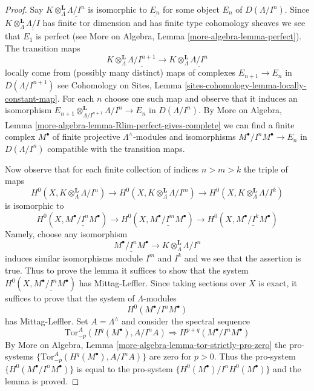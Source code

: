 \begin{proof}
Say $K \otimes_\Lambda^\mathbf{L} \underline{\Lambda/I^n}$ is isomorphic
to $\underline{E_n}$ for some object $E_n$ of $D(\Lambda/I^n)$.
Since $K \otimes_\Lambda^\mathbf{L} \underline{\Lambda/I}$ has
finite tor dimension and has finite type cohomology sheaves
we see that $E_1$ is perfect (see
More on Algebra, Lemma \ref{more-algebra-lemma-perfect}). The transition maps
$$
K \otimes_\Lambda^\mathbf{L} \underline{\Lambda/I^{n + 1}}
\to
K \otimes_\Lambda^\mathbf{L} \underline{\Lambda/I^n}
$$
locally come from (possibly many distinct) maps of complexes
$E_{n + 1} \to E_n$ in $D(\Lambda/I^{n + 1})$ see
Cohomology on Sites, Lemma \ref{sites-cohomology-lemma-locally-constant-map}.
For each $n$ choose one such map and observe that it induces
an isomorphism
$E_{n + 1} \otimes_{\Lambda/I^{n + 1}}^\mathbf{L} \Lambda/I^n \to E_n$
in $D(\Lambda/I^n)$. By
More on Algebra, Lemma \ref{more-algebra-lemma-Rlim-perfect-gives-complete}
we can find a finite complex $M^\bullet$ of finite projective
$\Lambda^\wedge$-modules and isomorphisms $M^\bullet/I^nM^\bullet \to E_n$
in $D(\Lambda/I^n)$ compatible with the transition maps.

\medskip\noindent
Now observe that for each finite collection of indices
$n > m > k$ the triple of maps
$$
H^0(X, K \otimes_\Lambda^\mathbf{L} \Lambda/I^n)
\to
H^0(X, K \otimes_\Lambda^\mathbf{L} \Lambda/I^m)
\to
H^0(X, K \otimes_\Lambda^\mathbf{L} \Lambda/I^k)
$$
is isomorphic to
$$
H^0(X, \underline{M^\bullet/I^nM^\bullet})
\to
H^0(X, \underline{M^\bullet/I^mM^\bullet})
\to
H^0(X, \underline{M^\bullet/I^kM^\bullet})
$$
Namely, choose any isomorphism
$$
\underline{M^\bullet/I^nM^\bullet} \to
K \otimes_\Lambda^\mathbf{L} \Lambda/I^n
$$
induces similar isomorphisms module $I^m$ and $I^k$ and we see that
the assertion is true. Thus to prove the lemma it suffices to show that
the system
$H^0(X, \underline{M^\bullet/I^nM^\bullet})$ has Mittag-Leffler.
Since taking sections over $X$ is exact, it suffices to prove that
the system of $\Lambda$-modules
$$
H^0(M^\bullet/I^nM^\bullet)
$$
has Mittag-Leffler. Set $A = \Lambda^\wedge$ and consider the spectral
sequence
$$
\text{Tor}_{-p}^A(H^q(M^\bullet), A/I^nA) \Rightarrow
H^{p + q}(M^\bullet/I^nM^\bullet)
$$
By More on Algebra, Lemma \ref{more-algebra-lemma-tor-strictly-pro-zero}
the pro-systems $\{\text{Tor}_{-p}^A(H^q(M^\bullet), A/I^nA)\}$ are zero
for $p > 0$. Thus the pro-system $\{H^0(M^\bullet/I^nM^\bullet)\}$
is equal to the pro-system $\{H^0(M^\bullet)/I^nH^0(M^\bullet)\}$
and the lemma is proved.
\end{proof}

